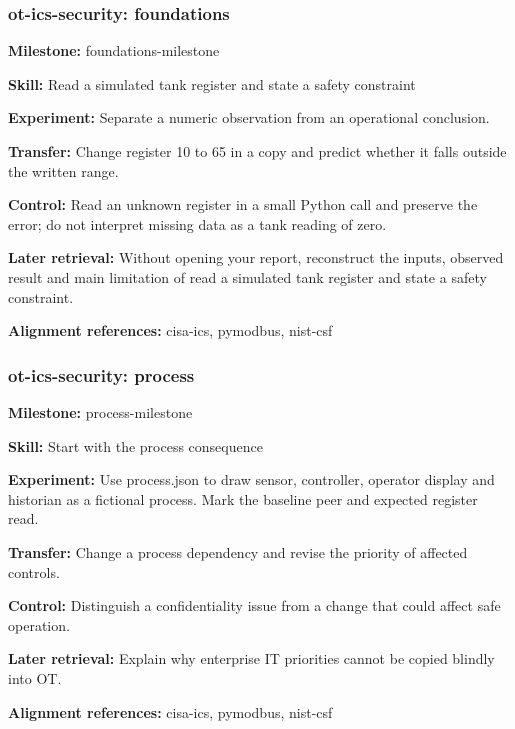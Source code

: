 \subsubsection{ot-ics-security: foundations}
\noindent\textbf{Milestone:} foundations-milestone\par
\noindent\textbf{Skill:} Read a simulated tank register and state a safety constraint\par
\noindent\textbf{Experiment:} Separate a numeric observation from an operational conclusion.\par
\noindent\textbf{Transfer:} Change register 10 to 65 in a copy and predict whether it falls outside the written range.\par
\noindent\textbf{Control:} Read an unknown register in a small Python call and preserve the error; do not interpret missing data as a tank reading of zero.\par
\noindent\textbf{Later retrieval:} Without opening your report, reconstruct the inputs, observed result and main limitation of read a simulated tank register and state a safety constraint.\par
\noindent\textbf{Alignment references:} cisa-ics, pymodbus, nist-csf\par
\subsubsection{ot-ics-security: process}
\noindent\textbf{Milestone:} process-milestone\par
\noindent\textbf{Skill:} Start with the process consequence\par
\noindent\textbf{Experiment:} Use process.json to draw sensor, controller, operator display and historian as a fictional process. Mark the baseline peer and expected register read.\par
\noindent\textbf{Transfer:} Change a process dependency and revise the priority of affected controls.\par
\noindent\textbf{Control:} Distinguish a confidentiality issue from a change that could affect safe operation.\par
\noindent\textbf{Later retrieval:} Explain why enterprise IT priorities cannot be copied blindly into OT.\par
\noindent\textbf{Alignment references:} cisa-ics, pymodbus, nist-csf\par
